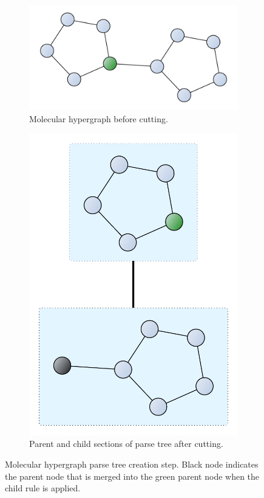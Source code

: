 \documentclass{article}
\begin{document}
\begin{figure}
    \centering
    \begin{subfigure}[b]{0.48\textwidth}
        \centering
        \includegraphics[scale=0.25]{images/mols_rule_before_cut.pdf}
        \caption{Molecular hypergraph before cutting.}
    \end{subfigure}
    \hfill
    \begin{subfigure}[b]{0.48\textwidth}
        \centering
        \includegraphics[scale=0.25]{images/mols_rule_after_cut.pdf}
        \caption{Parent and child sections of parse tree after cutting.}
    \end{subfigure}
    \caption{Molecular hypergraph parse tree creation step. Black node indicates the parent node that is merged into the green parent node when the child rule is applied.}
\end{figure}
\end{document}
